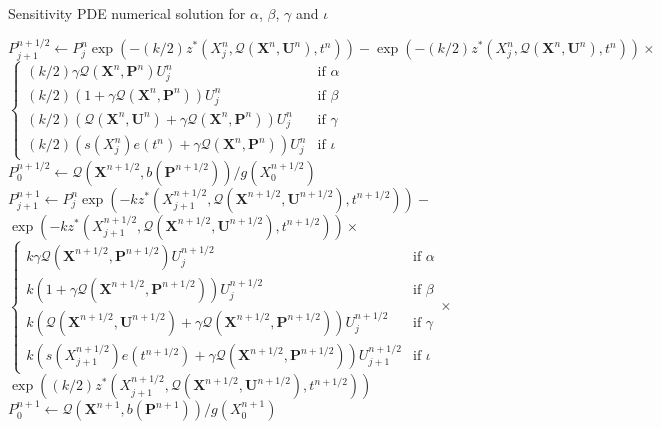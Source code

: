 \documentclass{article}
\begin{document}
\begin{algorithm}
  \caption{Sensitivity PDE numerical solution for $\alpha$, $\beta$, $\gamma$ and $\iota$}\label{alg:sens1}
  \begin{algorithmic}
    \State $P_{j+1}^{n+1/2} \gets P_j^n \exp\left(-(k/2)z^*(X_{j}^{n},\mathcal{Q}(\mathbf{X}^{n},\mathbf{U}^{n}),t^{n})\right)-\exp\left(-(k/2)z^*(X_{j}^{n},\mathcal{Q}(\mathbf{X}^{n},\mathbf{U}^{n}),t^{n})\right)\times$\\ \hspace{1cm} 
    $\begin{cases} (k/2)\gamma\mathcal{Q}(\mathbf{X}^n,\mathbf{P}^n)U_j^n & \text{if }\alpha \\ (k/2)\left(1+\gamma\mathcal{Q}(\mathbf{X}^n,\mathbf{P}^n)\right)U_j^n & \text{if }\beta \\ (k/2)\left(\mathcal{Q}(\mathbf{X}^n,\mathbf{U}^n)+\gamma\mathcal{Q}(\mathbf{X}^n,\mathbf{P}^n)\right)U_j^n & \text{if }\gamma \\ (k/2)\left(s(X_j^n)e(t^n)+\gamma\mathcal{Q}(\mathbf{X}^n,\mathbf{P}^n)\right)U_j^n & \text{if }\iota\end{cases}$
    \State $P_0^{n+1/2} \gets \mathcal{Q}(\mathbf{X}^{n+1/2},b(\mathbf{P}^{n+1/2})) / g(X_0^{n+1/2})$
    \State $P_{j+1}^{n+1} \gets P_j^n \exp\left(-k z^*(X_{j+1}^{n+1/2},\mathcal{Q}(\mathbf{X}^{n+1/2},\mathbf{U}^{n+1/2}),t^{n+1/2})\right)-$\\ \hspace{1cm} $\exp\left(-k z^*(X_{j+1}^{n+1/2},\mathcal{Q}(\mathbf{X}^{n+1/2},\mathbf{U}^{n+1/2}),t^{n+1/2})\right)\times$\\ \hspace{1cm} $\begin{cases}k\gamma\mathcal{Q}(\mathbf{X}^{n+1/2},\mathbf{P}^{n+1/2})U_j^{n+1/2} & \text{if } \alpha \\ k\left(1+\gamma\mathcal{Q}(\mathbf{X}^{n+1/2},\mathbf{P}^{n+1/2})\right)U_j^{n+1/2} & \text{if } \beta \\ k\left(\mathcal{Q}(\mathbf{X}^{n+1/2},\mathbf{U}^{n+1/2}) + \gamma\mathcal{Q}(\mathbf{X}^{n+1/2},\mathbf{P}^{n+1/2})\right)U_j^{n+1/2} & \text{if } \gamma \\ k\left(s(X_{j+1}^{n+1/2})e(t^{n+1/2})+\gamma\mathcal{Q}(\mathbf{X}^{n+1/2},\mathbf{P}^{n+1/2})\right)U_{j+1}^{n+1/2} & \text{if } \iota \end{cases}$\hspace{1cm}$\times$\\ \hspace{1cm} $ \exp\left((k/2)z^*(X_{j+1}^{n+1/2},\mathcal{Q}(\mathbf{X}^{n+1/2},\mathbf{U}^{n+1/2}),t^{n+1/2})\right)$
    \State $P_0^{n+1} \gets \mathcal{Q}(\mathbf{X}^{n+1},b(\mathbf{P}^{n+1})) / g(X_0^{n+1})$
  \end{algorithmic}
\end{algorithm}
\end{document}
